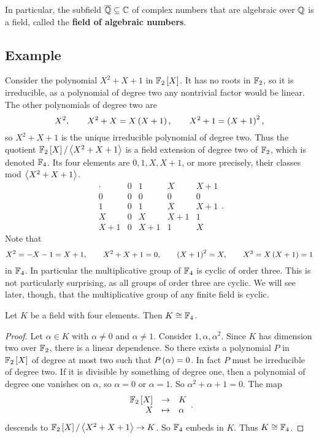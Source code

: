 \begin{example*}
In particular, the subfield $ \overline{\mathbb{Q}} \subseteq \mathbb{C} $ of complex numbers that are algebraic over $ \mathbb{Q} $ is a field, called the \textbf{field of algebraic numbers}.
\end{example*}

\subsection{Example}

\begin{example*}
Consider the polynomial $ X^2 + X + 1 $ in $ \mathbb{F}_2\left[ X \right] $. It has no roots in $ \mathbb{F}_2 $, so it is irreducible, as a polynomial of degree two any nontrivial factor would be linear. The other polynomials of degree two are
$$ X^2, \qquad X^2 + X = X\left( X + 1 \right), \qquad X^2 + 1 = \left( X + 1 \right)^2, $$
so $ X^2 + X + 1 $ is the unique irreducible polynomial of degree two. Thus the quotient $ \mathbb{F}_2\left[ X \right] / \left\langle X^2 + X + 1 \right\rangle $ is a field extension of degree two of $ \mathbb{F}_2 $, which is denoted $ \mathbb{F}_4 $. Its four elements are $ 0, 1, X, X + 1 $, or more precisely, their classes mod $ \left\langle X^2 + X + 1 \right\rangle $.
$$
\begin{array}{c|cccc}
\cdot & 0 & 1 & X & X + 1 \\
\hline
0 & 0 & 0 & 0 & 0 \\
1 & 0 & 1 & X & X + 1 \\
X & 0 & X & X + 1 & 1 \\
X + 1 & 0 & X + 1 & 1 & X
\end{array}.
$$
Note that
$$ X^2 = -X - 1 = X + 1, \qquad X^2 + X + 1 = 0, \qquad \left( X + 1 \right)^2 = X, \qquad X^3 = X\left( X + 1 \right) = 1 $$
in $ \mathbb{F}_4 $. In particular the multiplicative group of $ \mathbb{F}_4 $ is cyclic of order three. This is not particularly surprising, as all groups of order three are cyclic. We will see later, though, that the multiplicative group of any finite field is cyclic.
\end{example*}

\begin{proposition}
Let $ K $ be a field with four elements. Then $ K \cong \mathbb{F}_4 $.
\end{proposition}

\begin{proof}
Let $ \alpha \in K $ with $ \alpha \ne 0 $ and $ \alpha \ne 1 $. Consider $ 1, \alpha, \alpha^2 $. Since $ K $ has dimension two over $ \mathbb{F}_2 $, there is a linear dependence. So there exists a polynomial $ P $ in $ \mathbb{F}_2\left[ X \right] $ of degree at most two such that $ P\left( \alpha \right) = 0 $. In fact $ P $ must be irreducible of degree two. If it is divisible by something of degree one, then a polynomial of degree one vanishes on $ \alpha $, so $ \alpha = 0 $ or $ \alpha = 1 $. So $ \alpha^2 + \alpha + 1 = 0 $. The map
$$ \function{\F_2\sb{X}}{K}{X}{\alpha}. $$
descends to $ \mathbb{F}_2\left[ X \right] / \left\langle X^2 + X + 1 \right\rangle \to K $. So $ \mathbb{F}_4 $ embeds in $ K $. Thus $ K \cong \mathbb{F}_4 $.
\end{proof}

